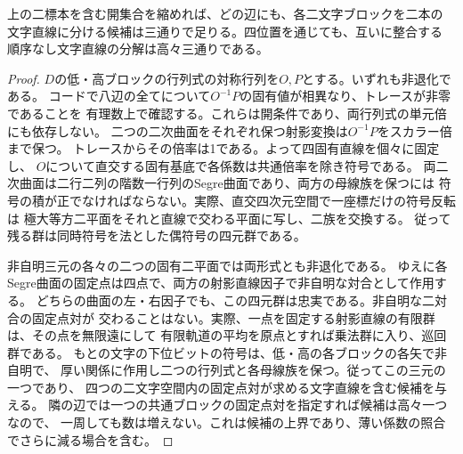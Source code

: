 \begin{corollary}\label{cor:three-character-frames}
上の二標本を含む開集合を縮めれば、どの辺にも、各二文字ブロックを二本の
文字直線に分ける候補は三通りで足りる。四位置を通じても、互いに整合する
順序なし文字直線の分解は高々三通りである。
\end{corollary}
\begin{proof}
$D$の低・高ブロックの行列式の対称行列を$O,P$とする。いずれも非退化である。
コードで八辺の全てについて$O^{-1}P$の固有値が相異なり、トレースが非零であることを
有理数上で確認する。これらは開条件であり、両行列式の単元倍にも依存しない。
二つの二次曲面をそれぞれ保つ射影変換は$O^{-1}P$をスカラー倍まで保つ。
トレースからその倍率は1である。よって四固有直線を個々に固定し、
$O$について直交する固有基底で各係数は共通倍率を除き符号である。
両二次曲面は二行二列の階数一行列のSegre曲面であり、両方の母線族を保つには
符号の積が正でなければならない。実際、直交四次元空間で一座標だけの符号反転は
極大等方二平面をそれと直線で交わる平面に写し、二族を交換する。
従って残る群は同時符号を法とした偶符号の四元群である。

非自明三元の各々の二つの固有二平面では両形式とも非退化である。
ゆえに各Segre曲面の固定点は四点で、両方の射影直線因子で非自明な対合として作用する。
どちらの曲面の左・右因子でも、この四元群は忠実である。非自明な二対合の固定点対が
交わることはない。実際、一点を固定する射影直線の有限群は、その点を無限遠にして
有限軌道の平均を原点とすれば乗法群に入り、巡回群である。
もとの文字の下位ビットの符号は、低・高の各ブロックの各矢で非自明で、
厚い関係に作用し二つの行列式と各母線族を保つ。従ってこの三元の一つであり、
四つの二文字空間内の固定点対が求める文字直線を含む候補を与える。
隣の辺では一つの共通ブロックの固定点対を指定すれば候補は高々一つなので、
一周しても数は増えない。これは候補の上界であり、薄い係数の照合でさらに減る場合を含む。
\end{proof}
